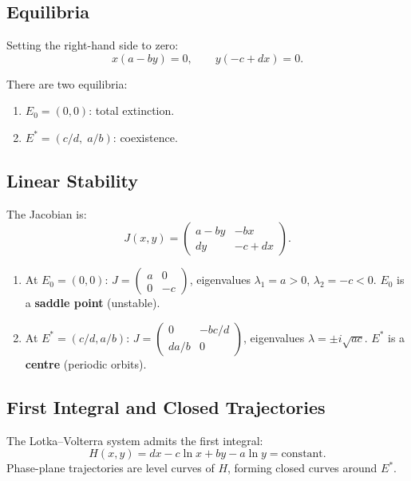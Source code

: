 \subsection{Equilibria}

Setting the right-hand side to zero:
\[
  x(a-by)=0, \qquad y(-c+dx)=0.
\]

\begin{proposition}
There are two equilibria:
\begin{enumerate}
  \item $E_0 = (0,0)$: total extinction.
  \item $E^* = (c/d,\;a/b)$: coexistence.
\end{enumerate}
\end{proposition}

\subsection{Linear Stability}

The Jacobian is:
\[
  J(x,y) = \begin{pmatrix}
    a-by & -bx \\ dy & -c+dx
  \end{pmatrix}.
\]

\begin{theorem}
\begin{enumerate}
  \item At $E_0=(0,0)$: $J = \begin{pmatrix}a&0\\0&-c\end{pmatrix}$,
    eigenvalues $\lambda_1=a>0$, $\lambda_2=-c<0$.
    $E_0$ is a \textbf{saddle point} (unstable).
  \item At $E^*=(c/d,a/b)$: $J = \begin{pmatrix}0&-bc/d\\da/b&0\end{pmatrix}$,
    eigenvalues $\lambda=\pm i\sqrt{ac}$.
    $E^*$ is a \textbf{centre} (periodic orbits).
\end{enumerate}
\end{theorem}

\subsection{First Integral and Closed Trajectories}

\begin{theorem}
The Lotka--Volterra system admits the first integral:
\[
  H(x,y) = dx - c\ln x + by - a\ln y = \text{constant}.
\]
Phase-plane trajectories are level curves of $H$, forming closed
curves around $E^*$.
\end{theorem}

